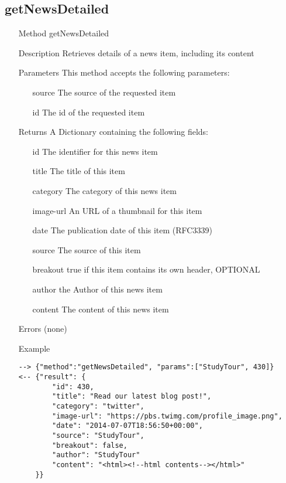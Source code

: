 \documentclass[a4paper]{scrreprt}
\begin{document}
\subsection{getNewsDetailed}
\begin{enumerate}
\item[Method] getNewsDetailed
\item[Description] Retrieves details of a news item, including its content
\item[Parameters] This method accepts the following parameters:
	\begin{enumerate}
		\item[source] The source of the requested item
    	\item[id] The id of the requested item
    \end{enumerate}
\item[Returns] A Dictionary containing the following fields:
\begin{enumerate}
    \item[id] The identifier for this news item
    \item[title] The title of this item
	\item[category] The category of this news item
    \item[image-url] An URL of a thumbnail for this item
    \item[date] The publication date of this item (RFC3339)
    \item[source] The source of this item
    \item[breakout] true if this item contains its own header, OPTIONAL
    \item[author] the Author of this news item
    \item[content] The content of this news item
	\end{enumerate}
\item[Errors] (none)
\item[Example]
\begin{lstlisting}
--> {"method":"getNewsDetailed", "params":["StudyTour", 430]}
<-- {"result": {
        "id": 430,
        "title": "Read our latest blog post!", 
        "category": "twitter",
        "image-url": "https://pbs.twimg.com/profile_image.png",
        "date": "2014-07-07T18:56:50+00:00", 
        "source": "StudyTour", 
        "breakout": false,
        "author": "StudyTour"
        "content": "<html><!--html contents--></html>"
    }}
\end{lstlisting}
\end{enumerate}
\end{document}
